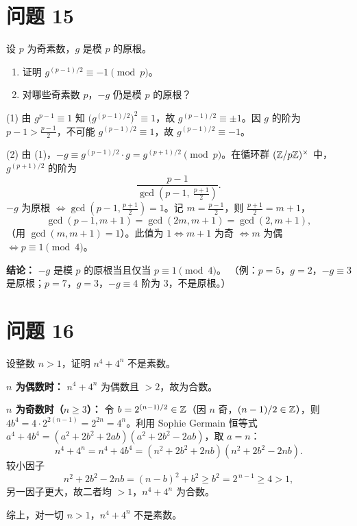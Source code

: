 \documentclass{article}
\begin{document}
\section{问题 15}

设 $p$ 为奇素数，$g$ 是模 $p$ 的原根。

\begin{enumerate}[(1)]
  \item 证明 $g^{(p-1)/2}\equiv -1\pmod p$。
  \item 对哪些奇素数 $p$，$-g$ 仍是模 $p$ 的原根？
\end{enumerate}

\begin{solution}
  (1) 由 $g^{p-1}\equiv1$ 知 $\big(g^{(p-1)/2}\big)^2\equiv1$，故 $g^{(p-1)/2}\equiv\pm1$。因 $g$ 的阶为 $p-1>\tfrac{p-1}2$，不可能 $g^{(p-1)/2}\equiv1$，故 $g^{(p-1)/2}\equiv -1$。

  (2) 由 (1)，$-g\equiv g^{(p-1)/2}\cdot g=g^{(p+1)/2}\pmod p$。在循环群 $(\mathbb{Z}/p\mathbb{Z})^\times$ 中，$g^{(p+1)/2}$ 的阶为
  \[
    \frac{p-1}{\gcd\!\left(p-1,\ \tfrac{p+1}2\right)}.
  \]
  $-g$ 为原根 $\iff\gcd\!\left(p-1,\tfrac{p+1}2\right)=1$。记 $m=\tfrac{p-1}2$，则 $\tfrac{p+1}2=m+1$，
  \[
    \gcd(p-1,m+1)=\gcd(2m,m+1)=\gcd(2,m+1),
  \]
  （用 $\gcd(m,m+1)=1$）。此值为 $1\iff m+1$ 为奇 $\iff m$ 为偶 $\iff p\equiv1\pmod4$。

  \textbf{结论：} $-g$ 是模 $p$ 的原根当且仅当 $\boxed{p\equiv1\pmod4}$。
  （例：$p=5$，$g=2$，$-g\equiv3$ 是原根；$p=7$，$g=3$，$-g\equiv4$ 阶为 $3$，不是原根。）
\end{solution}

\section{问题 16}

设整数 $n>1$，证明 $n^4+4^n$ 不是素数。

\begin{solution}
  \textbf{$n$ 为偶数时：} $n^4+4^n$ 为偶数且 $>2$，故为合数。

  \textbf{$n$ 为奇数时（$n\ge3$）：} 令 $b=2^{(n-1)/2}\in\mathbb{Z}$（因 $n$ 奇，$(n-1)/2\in\mathbb{Z}$），则 $4b^4=4\cdot2^{2(n-1)}=2^{2n}=4^n$。利用 Sophie Germain 恒等式 $a^4+4b^4=(a^2+2b^2+2ab)(a^2+2b^2-2ab)$，取 $a=n$：
  \[
    n^4+4^n=n^4+4b^4=(n^2+2b^2+2nb)(n^2+2b^2-2nb).
  \]
  较小因子
  \[
    n^2+2b^2-2nb=(n-b)^2+b^2\ge b^2=2^{\,n-1}\ge 4>1,
  \]
  另一因子更大，故二者均 $>1$，$n^4+4^n$ 为合数。

  综上，对一切 $n>1$，$n^4+4^n$ 不是素数。
\end{solution}
\end{document}
